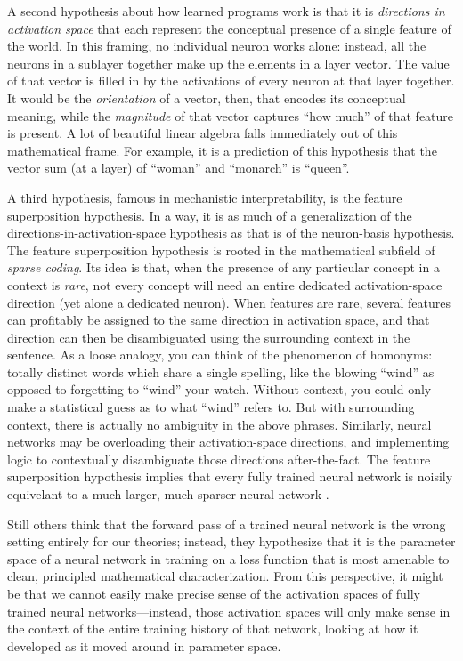 A second hypothesis about how learned programs work is that it is
\emph{directions in activation space} that each represent the conceptual
presence of a single feature of the world. In this framing, no individual
neuron works alone: instead, all the neurons in a sublayer together make up the
elements in a layer vector. The value of that vector is filled in by the
activations of every neuron at that layer together. It would be the
\emph{orientation} of a vector, then, that encodes its conceptual meaning,
while the \emph{magnitude} of that vector captures ``how much'' of that feature
is present. A lot of beautiful linear algebra falls immediately out of this
mathematical frame. For example, it is a prediction of this hypothesis that the
vector sum (at a layer) of ``woman'' and ``monarch'' is ``queen''.

A third hypothesis, famous in mechanistic interpretability, is the feature
superposition hypothesis. In a way, it is as much of a generalization of the
directions-in-activation-space hypothesis as that is of the neuron-basis
hypothesis. The feature superposition hypothesis is rooted in the mathematical
subfield of \emph{sparse coding}. Its idea is that, when the presence of any
particular concept in a context is \emph{rare}, not every concept will need an
entire dedicated activation-space direction (yet alone a dedicated neuron).
When features are rare, several features can profitably be assigned to the same
direction in activation space, and that direction can then be disambiguated
using the surrounding context in the sentence. As a loose analogy, you can
think of the phenomenon of homonyms: totally distinct words which share a
single spelling, like the blowing ``wind'' as opposed to forgetting to ``wind''
your watch. Without context, you could only make a statistical guess as to what
``wind'' refers to. But with surrounding context, there is actually no
ambiguity in the above phrases. Similarly, neural networks may be
overloading their activation-space directions, and implementing logic to
contextually disambiguate those directions after-the-fact. The feature
superposition hypothesis implies that every fully trained neural network is
noisily equivelant to a much larger, much sparser neural network
\cite{elhage2022superposition}.

Still others think that the forward pass of a trained neural network is the
wrong setting entirely for our theories; instead, they hypothesize that it is
the parameter space of a neural network in training on a loss function that is
most amenable to clean, principled mathematical characterization. From this
perspective, it might be that we cannot easily make precise sense of the
activation spaces of fully trained neural networks---instead, those activation
spaces will only make sense in the context of the entire training history of
that network, looking at how it developed as it moved around in parameter space.

